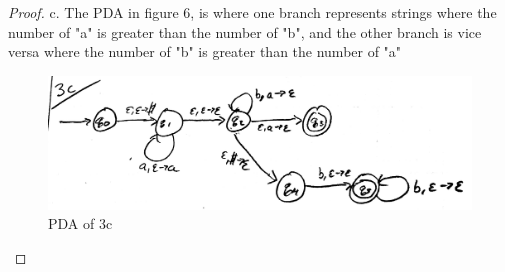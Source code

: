 \documentclass[12pt]{article}
\begin{document}
\begin{proof}
c. The PDA in figure 6, is where one branch represents strings where the number of "a" is greater than the number of "b", and the other branch is vice versa where the number of "b" is greater than the number of "a"
\begin{figure}
  \includegraphics[width=\linewidth]{3c.png}
  \caption{PDA of 3c}
\end{figure}

\end{proof}
\end{document}
